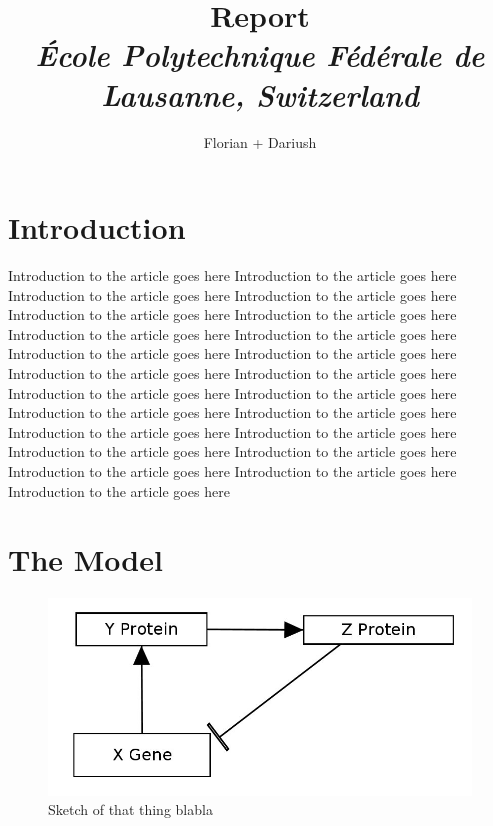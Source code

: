 \documentclass[10pt,a4paper,oneside,twocolumn]{article}
\numberwithin{equation}{section} %
\begin{document}
\title{\huge{\textbf{Report}}\\
	\vspace{0.5cm}
	\Large{\textit{\'Ecole Polytechnique F\'ed\'erale de Lausanne, Switzerland}}}
\author{\large{Florian + Dariush}}

\begin{titlepage}
 \maketitle
\thispagestyle{empty}
\end{titlepage}

\section{Introduction}
    Introduction to the article goes here    Introduction to the article goes here  Introduction to the article goes here  Introduction to the article goes here  Introduction to the article goes here  Introduction to the article goes here  Introduction to the article goes here  Introduction to the article goes here  Introduction to the article goes here  Introduction to the article goes here  Introduction to the article goes here  Introduction to the article goes here  Introduction to the article goes here  Introduction to the article goes here  Introduction to the article goes here  Introduction to the article goes here  Introduction to the article goes here  Introduction to the article goes here  Introduction to the article goes here  Introduction to the article goes here  Introduction to the article goes here  Introduction to the article goes here Introduction to the article goes here \\

\section{The Model}

    \begin{figure}[!h]
	\centering
	\includegraphics[scale=0.3]{sketch.png}
	\caption{Sketch of that thing blabla}
    \end{figure}
    
\end{document}

